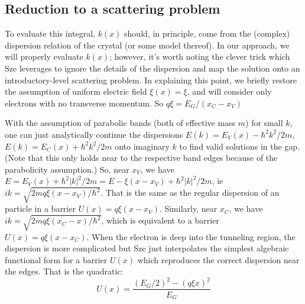 \subsection{Reduction to a scattering problem}
To evaluate this integral, $k(x)$ should, in principle, come from the (complex) dispersion relation of the crystal (or some model thereof).  In our approach, we will properly evaluate $k(x)$; however, it's worth noting the clever trick which Sze leverages to ignore the details of the dispersion and map the solution onto an introductory-level scattering problem.  In explaining this point, we briefly restore the assumption of uniform electric field $\xi(x)=\xi$, and will consider only electrons with no transverse momentum.  So $q\xi=E_G/(x_C-x_V)$

With the assumption of parabolic bands (both of effective mass $m$) for small $k$, one can just analytically continue the dispersions $E(k)=E_V(x)-\hbar^2k^2/2m$, $E(k)=E_C(x)+\hbar^2k^2/2m$ onto imaginary $k$ to find valid solutions in the gap.  (Note that this only holds near to the respective band edges because of the parabolicity assumption.)  So, near $x_V$, we have $E=E_V(x)+\hbar^2|k|^2/2m=E-\xi(x-x_V)+\hbar^2|k|^2/2m$, ie $ik=\sqrt{2mq\xi(x-x_V)/\hbar^2}$.  That is the same as the regular dispersion of an particle in a barrier $U(x)=q\xi(x-x_V)$.  Similarly, near $x_C$, we have $ik=\sqrt{2mq\xi(x_C-x)/\hbar^2}$, which is equivalent to a barrier $U(x)=q\xi(x-x_C)$.  When the electron is deep into the tunneling region, the dispersion is more complicated but Sze just interpolates the simplest algebraic functional form for a barrier $U(x)$ which reproduces the correct dispersion near the edges.  That is the quadratic:
$$U(x)=\frac{(E_G/2)^2-(q\xi x)^2}{E_G}$$